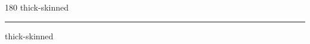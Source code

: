 
\begin{frame}
\begin{center}
\begin{turn}{180}
{\fontsize{2.5cm}{1em}\selectfont thick-skinned}
\end{turn}
\vspace{1em}\par  
\hrule
\vspace{1em}\par  
{\fontsize{2.5cm}{1em}\selectfont thick-skinned}
\end{center}
\end{frame}
